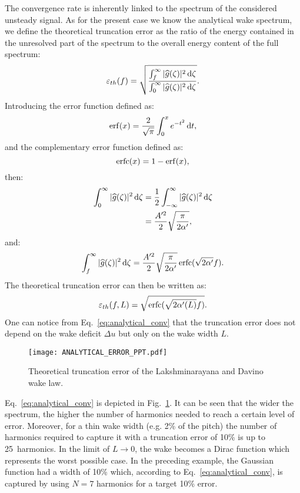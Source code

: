 The convergence rate is inherently linked to
the spectrum of the considered unsteady signal.
As for the present case we know the analytical wake spectrum,
we define the theoretical truncation error as the ratio of
the energy contained in the unresolved part 
of the spectrum to the overall energy content of the full spectrum:
\begin{equation}
    \varepsilon_{th}(f) = \sqrt{\frac{
        \int_f^\infty | \widehat{g}(\zeta)|^2 \diff \zeta
      }{
        \int_0^\infty | \widehat{g}(\zeta)|^2 \diff \zeta
      }}.
    \label{eq:def_truncation_error}
\end{equation}
Introducing the error function defined as:
\begin{equation}
    \operatorname{erf}(x) = \frac{2}{\sqrt{\pi}} \int_0^x e^{-t^2} \mathop{}\!\mathrm{d} t,
\end{equation}
and the complementary error function defined as:
\begin{equation}
    \operatorname{erfc}(x) = 1 - \operatorname{erf}(x),
\end{equation}
then:
\begin{align}
    \int_0^\infty | \widehat{g}(\zeta)|^2 \mathop{}\!\mathrm{d} \zeta 
    &= \frac{1}{2} \int_{- \infty}^\infty | \widehat{g}(\zeta)|^2 \mathop{}\!\mathrm{d} \zeta \\
    &= \frac{A^{\prime 2}}{2} \sqrt{\frac{\pi}{2 \alpha^\prime}},
\end{align}
and:
\begin{equation}
    \int_f^\infty | \widehat{g}(\zeta)|^2 \mathop{}\!\mathrm{d} \zeta = 
      \frac{A^{\prime 2}}{2} \sqrt{\frac{\pi}{2 \alpha^\prime}} \operatorname{erfc} (\sqrt{2 \alpha^\prime} f).
\end{equation}
The theoretical truncation error can then be written as:
\begin{equation}
    \varepsilon_{th}(f, L) = \sqrt{\erfc (\sqrt{2 \alpha^\prime(L) } f)}.
    \label{eq:analytical_conv}
\end{equation}
One can notice from Eq.~\eqref{eq:analytical_conv} that the 
truncation error does not depend on the wake deficit $\Delta u$ 
but only on the wake width $L$.

\begin{figure}[htb]
    \centering\texttt{[image: ANALYTICAL\_ERROR\_PPT.pdf]}
  \caption{Theoretical truncation error of the Lakshminarayana and Davino wake law.}
  \label{fig:analytic_error_paper}
\end{figure}
Eq.~\eqref{eq:analytical_conv} is depicted in
Fig.~\ref{fig:analytic_error_paper}. 
It can be seen that the wider the spectrum,
the higher the number of harmonics needed to
reach a certain level of error. 
Moreover, for a thin wake width (e.g. 2\% of the pitch)
the number of harmonics required to capture it with a truncation 
error of 10\% is up to 25~harmonics.
In the limit of $L \to 0$, the wake becomes a Dirac function
which represents the worst possible case.
In the preceding example, the Gaussian function had a width
of 10\% which, according to Eq.~\eqref{eq:analytical_conv},
is captured by using $N=7$ harmonics for a target 10\% error.